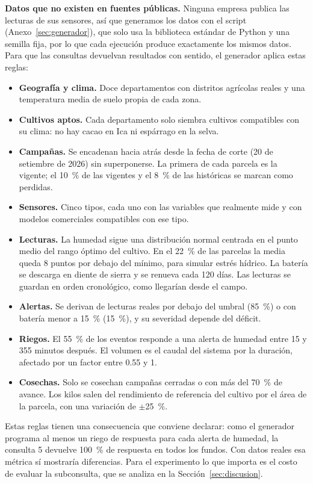 \textbf{Datos que no existen en fuentes públicas.} Ninguna empresa publica las lecturas de sus sensores, así que generamos los datos con el script  (Anexo~\ref{sec:generador}), que solo usa la biblioteca estándar de Python y una semilla fija, por lo que cada ejecución produce exactamente los mismos datos. Para que las consultas devuelvan resultados con sentido, el generador aplica estas reglas:

\begin{itemize}[leftmargin=1.4em,itemsep=0.1em]
\item \textbf{Geografía y clima.} Doce departamentos con distritos agrícolas reales y una temperatura media de suelo propia de cada zona.
\item \textbf{Cultivos aptos.} Cada departamento solo siembra cultivos compatibles con su clima: no hay cacao en Ica ni espárrago en la selva.
\item \textbf{Campañas.} Se encadenan hacia atrás desde la fecha de corte (20 de setiembre de 2026) sin superponerse. La primera de cada parcela es la vigente; el 10~\% de las vigentes y el 8~\% de las históricas se marcan como perdidas.
\item \textbf{Sensores.} Cinco tipos, cada uno con las variables que realmente mide y con modelos comerciales compatibles con ese tipo.
\item \textbf{Lecturas.} La humedad sigue una distribución normal centrada en el punto medio del rango óptimo del cultivo. En el 22~\% de las parcelas la media queda 8 puntos por debajo del mínimo, para simular estrés hídrico. La batería se descarga en diente de sierra y se renueva cada 120 días. Las lecturas se guardan en orden cronológico, como llegarían desde el campo.
\item \textbf{Alertas.} Se derivan de lecturas reales por debajo del umbral (85~\%) o con batería menor a 15~\% (15~\%), y su severidad depende del déficit.
\item \textbf{Riegos.} El 55~\% de los eventos responde a una alerta de humedad entre 15 y 355 minutos después. El volumen es el caudal del sistema por la duración, afectado por un factor entre 0.55 y 1.
\item \textbf{Cosechas.} Solo se cosechan campañas cerradas o con más del 70~\% de avance. Los kilos salen del rendimiento de referencia del cultivo por el área de la parcela, con una variación de $\pm$25~\%.
\end{itemize}

Estas reglas tienen una consecuencia que conviene declarar: como el generador programa al menos un riego de respuesta para cada alerta de humedad, la consulta 5 devuelve 100~\% de respuesta en todos los fundos. Con datos reales esa métrica sí mostraría diferencias. Para el experimento lo que importa es el costo de evaluar la subconsulta, que se analiza en la Sección~\ref{sec:discusion}.


